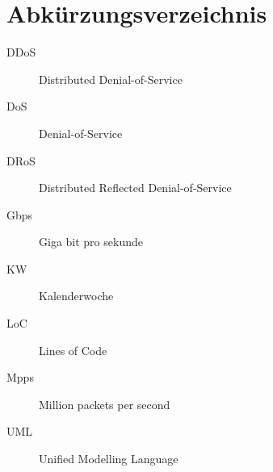 \documentclass[../review_3.tex]{subfiles}
\begin{document}
\chapter{Abkürzungsverzeichnis}\thispagestyle{fancy}
\begin{description}
    \item[DDoS] Distributed Denial-of-Service
    \item[DoS] Denial-of-Service
    \item[DRoS] Distributed Reflected Denial-of-Service
    \item[Gbps] Giga bit pro sekunde
    \item[KW] Kalenderwoche
    \item[LoC] Lines of Code
    \item[Mpps] Million packets per second
    \item[UML] Unified Modelling Language
\end{description}
\end{document}

